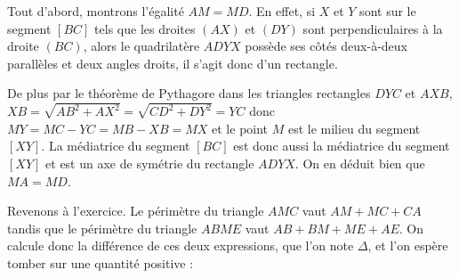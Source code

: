 \begin{center}
\end{center}

Tout d'abord, montrons l'égalité $AM=MD$. En effet, si $X$ et $Y$ sont sur le segment $[BC]$ tels que les droites $(AX)$ et $(DY)$ sont perpendiculaires à la droite $(BC)$, alors le quadrilatère $ADYX$ possède ses côtés deux-à-deux parallèles et deux angles droits, il s'agit donc d'un rectangle.

De plus par le théorème de Pythagore dans les triangles rectangles $DYC$ et $AXB$, $XB=\sqrt{AB^2+AX^2}=\sqrt{CD^2+DY^2}=YC$ donc $MY=MC-YC=MB-XB=MX$ et le point $M$ est le milieu du segment $[XY]$. La médiatrice du segment $[BC]$ est donc aussi la médiatrice du segment $[XY]$ et est un axe de symétrie du rectangle $ADYX$. On en déduit bien que $MA=MD$.

\medskip

Revenons à l'exercice.
Le périmètre du triangle $AMC$ vaut $AM+MC+CA$ tandis que le périmètre du triangle $ABME$ vaut $AB+BM+ME+AE$. On calcule donc la différence de ces deux expressions, que l'on note
$\Delta$, et l'on espère tomber sur une quantité positive :

